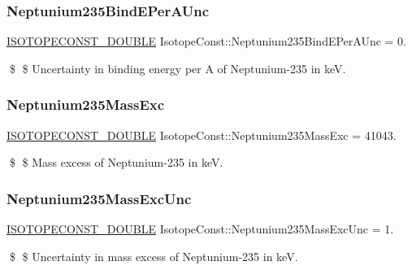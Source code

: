 \subsubsection{\texorpdfstring{Neptunium235\+Bind\+E\+Per\+A\+Unc}{Neptunium235BindEPerAUnc}}
{\footnotesize\ttfamily \mbox{\hyperlink{group___isotope_const-_macros_ga8f45a7272ce02c0b4c65c44636ed719a}{I\+S\+O\+T\+O\+P\+E\+C\+O\+N\+S\+T\+\_\+\+D\+O\+U\+B\+LE}} Isotope\+Const\+::\+Neptunium235\+Bind\+E\+Per\+A\+Unc = 0.}

\$ \$ Uncertainty in binding energy per A of Neptunium-\/235 in keV. \mbox{\label{group___isotope_const-_neptunium-_np235_gaae821664e2a1763c9262a8f0313e95c4}} 
\subsubsection{\texorpdfstring{Neptunium235\+Mass\+Exc}{Neptunium235MassExc}}
{\footnotesize\ttfamily \mbox{\hyperlink{group___isotope_const-_macros_ga8f45a7272ce02c0b4c65c44636ed719a}{I\+S\+O\+T\+O\+P\+E\+C\+O\+N\+S\+T\+\_\+\+D\+O\+U\+B\+LE}} Isotope\+Const\+::\+Neptunium235\+Mass\+Exc = 41043.}

\$ \$ Mass excess of Neptunium-\/235 in keV. \mbox{\label{group___isotope_const-_neptunium-_np235_gab823b86a11487ff3c12b5d2c0d72e74d}} 
\subsubsection{\texorpdfstring{Neptunium235\+Mass\+Exc\+Unc}{Neptunium235MassExcUnc}}
{\footnotesize\ttfamily \mbox{\hyperlink{group___isotope_const-_macros_ga8f45a7272ce02c0b4c65c44636ed719a}{I\+S\+O\+T\+O\+P\+E\+C\+O\+N\+S\+T\+\_\+\+D\+O\+U\+B\+LE}} Isotope\+Const\+::\+Neptunium235\+Mass\+Exc\+Unc = 1.}

\$ \$ Uncertainty in mass excess of Neptunium-\/235 in keV. \mbox{\label{group___isotope_const-_neptunium-_np235_ga5248166975212ce875162f5be3df09e4}} 

